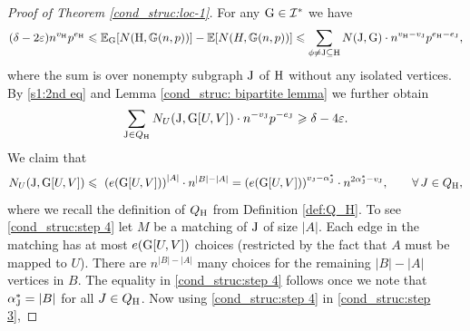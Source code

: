 \documentclass[a4paper,11pt,english,reqno]{amsart}
\numberwithin{equation}{section}
\renewcommand{\leq}{\leqslant}
\renewcommand{\geq}{\geqslant}
\newcommand{\E}{\mathbb{E}}
\newcommand{\uH}{\textup{H}}
\newcommand{\G}{\mathbb{G}}
\newcommand{\tu}[1]{\textup{#1}}
\begin{document}
			\begin{proof}[Proof of Theorem \ref{cond_struc:loc-1}]
				For any $\tu{G} \in \mathcal{I}^*$ we have
				\begin{equation}\label{eq:J-sum}
					(\delta -2\varepsilon) n^{v_{\uH}}p^{e_{\uH}} \leq \E_{\tu{G}}[N(\uH, \G(n,p))]-\E[N(H, \G(n,p))]\leq \sum_{\phi\neq \tu{J}\subseteq \uH} N(\tu{J}, \tu{G})\cdot  n^{v_{\uH}-v_{\tu{J}}} p^{e_{\uH}-e_{\tu{J}}},
				\end{equation}
				where the sum is over nonempty subgraph $\tu{J}$ of $\uH$ without any isolated vertices. By \eqref{s1:2nd eq} and %
				Lemma \ref{cond_struc: bipartite lemma} %
				we further obtain
				\begin{equation}
					\label{cond_struc:step 3}
					\sum_{\tu{J}\in Q_{\uH}} N_{U}(\tu{J}, \tu{G}[U,V])\cdot n^{-v_{\tu{J}}} p^{-e_{\tu{J}}}\geq \delta -4\varepsilon.
				\end{equation}
				We claim that
				\begin{equation}
					\label{cond_struc:step 4}
					N_{U}(\tu{J}, \tu{G}[U,V])\leq\ \left(e(\tu{G}[U,V])\right)^{|A|} \cdot n^{|B|-|A|} = 	\left(e(\tu{G}[U,V])\right)^{v_{\tu{J}}-\alpha_{\tu{J}}^{*}} \cdot n^{2\alpha_{\tu{J}}^{*}-v_{\tu{J}}}, \qquad \forall \, J \in Q_{\uH},
				\end{equation}
				where we recall the definition of $Q_{\uH}$ from Definition \ref{def:Q_H}. To see \eqref{cond_struc:step 4} let $M$ be a matching of $\tu{J}$ of size $|A|$. Each edge in the matching has at most $e(\tu{G}[U, V])$ choices (restricted by the fact that $A$ must be mapped to $U$). There are $n^{|B|-|A|}$ many choices for the remaining $|B|-|A|$ vertices in $B$. The equality in \eqref{cond_struc:step 4} follows once we note that $\alpha_{\tu{J}}^{*} = |B|$ for all $J \in Q_{\uH}$. Now using  \eqref{cond_struc:step 4} in \eqref{cond_struc:step 3},

\end{proof}
\end{document}
